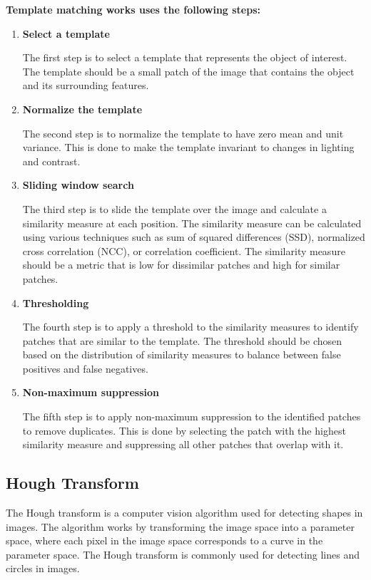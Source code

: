     \textbf{Template matching works uses the following steps:}
        \begin{enumerate}

            \item \textbf{Select a template}

            The first step is to select a template that represents the object of interest. 
            The template should be a small patch of the image that contains the object and its surrounding features.

            \item \textbf{Normalize the template}

            The second step is to normalize the template to have zero mean and unit variance. 
            This is done to make the template invariant to changes in lighting and contrast.

            \item \textbf{Sliding window search}

            The third step is to slide the template over the image and calculate a similarity measure at each position. 
            The similarity measure can be calculated using various techniques such as sum of squared differences (SSD), normalized cross correlation (NCC), or correlation coefficient. 
            The similarity measure should be a metric that is low for dissimilar patches and high for similar patches.

            \item \textbf{Thresholding}

            The fourth step is to apply a threshold to the similarity measures to identify patches that are similar to the template. 
            The threshold should be chosen based on the distribution of similarity measures to balance between false positives and false negatives. 

            \item \textbf{Non-maximum suppression}
            
            The fifth step is to apply non-maximum suppression to the identified patches to remove duplicates. 
            This is done by selecting the patch with the highest similarity measure and suppressing all other patches that overlap with it.

        \end{enumerate}

    \subsection{Hough Transform}
    The Hough transform is a computer vision algorithm used for detecting shapes in images.  
    The algorithm works by transforming the image space into a parameter space, where each pixel in the image space corresponds to a curve in the parameter space. 
    The Hough transform is commonly used for detecting lines and circles in images.
    
